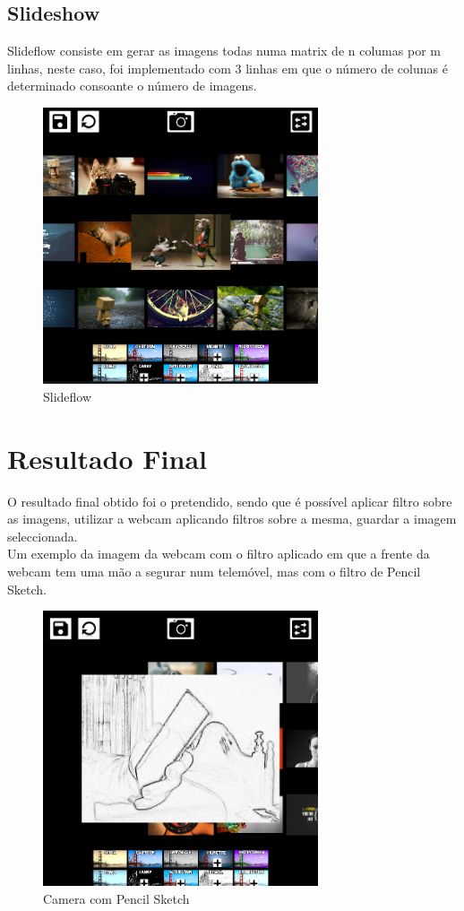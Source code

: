 \documentclass[portugues,final]{revdetua}
\begin{document}
\subsection{Slideshow}

Slideflow consiste em gerar as imagens todas numa matrix de n columas por m linhas, neste caso, foi implementado com 3 linhas em que o número de colunas é determinado consoante o número de imagens.

\begin{figure}[H]
\centerline{\includegraphics[width=230pt]{images/slideflow.png}}
\caption{Slideflow}
\label{img:complete}
\end{figure}

\section{Resultado Final}

O resultado final obtido foi o pretendido, sendo que é possível aplicar filtro sobre as imagens, utilizar a webcam aplicando filtros sobre a mesma, guardar a imagem seleccionada.\\

Um exemplo da imagem da webcam com o filtro aplicado em que a frente da webcam tem uma mão a segurar num telemóvel, mas com o filtro de Pencil Sketch.

\begin{figure}[H]
\centerline{\includegraphics[width=230pt]{images/camera.png}}
\caption{Camera com Pencil Sketch}
\label{img:complete}
\end{figure}
\end{document}
